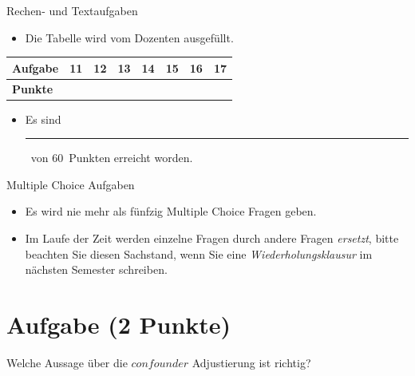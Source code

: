 \documentclass[a4paper, 10pt]{scrartcl}\usepackage[]{graphicx}\usepackage[]{xcolor}
\def\textpoints{60}
\begin{document}
\begin{graybox}{Rechen- und Textaufgaben}
  \begin{itemize}
  \item Die Tabelle wird vom Dozenten ausgefüllt.
  \end{itemize}
  \begin{center}
    \large
    \begin{tabular}{|l|c|c|c|c|c|c|c|}
      \hline
      \textbf{Aufgabe} & 11 & 12 & 13 & 14 & 15 & 16 & 17 \strut\\
      \hline
      \textbf{Punkte} & \phantom{1111}  & \phantom{1212}  & \phantom{1313}  & \phantom{1414}  & \phantom{1515}  & \phantom{1616}  & \phantom{1717}
                                                                                                                                    \strut\\
      \hline
  \end{tabular}
\end{center}
\begin{itemize}
\item Es sind \rule[0ex]{2em}{.4pt}\, von \textpoints\, Punkten erreicht worden.
\end{itemize}
\end{graybox}

\clearpage
\begin{graybox}{Multiple Choice Aufgaben}
  \begin{itemize}
  \item Es wird nie mehr als fünfzig Multiple Choice Fragen geben.
  \item Im Laufe der Zeit werden einzelne Fragen durch andere Fragen \textit{ersetzt}, bitte beachten Sie diesen Sachstand, wenn Sie eine \textit{Wiederholungsklausur} im nächsten Semester schreiben. 
  \end{itemize}
\end{graybox}
    

\section{Aufgabe \hfill (2 Punkte)}



Welche Aussage {\"u}ber die \textbf{$confounder$} Adjustierung ist richtig?
\end{document}
